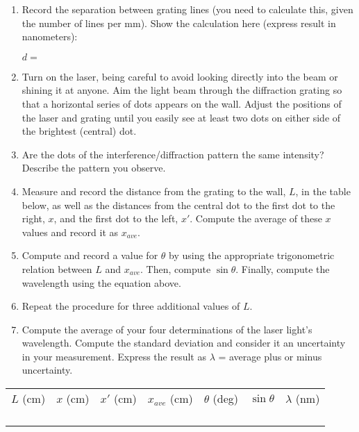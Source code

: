 \begin{enumerate}[labparts]
\item Record the separation between grating lines (you need to calculate this, given the number of lines per mm). Show the calculation here (express result in nanometers):

\( d= \)
\vspace{10mm}
\item Turn on the laser, being careful to avoid looking directly into the
beam or shining it at anyone. Aim the light beam through the diffraction
grating so that a horizontal series of dots appears on the wall. Adjust
the positions of the laser and grating until you easily see at least
two dots on either side of the brightest (central) dot.
\item Are the dots of the interference/diffraction pattern the same intensity?
Describe the pattern you observe.\vspace{15mm}

\item Measure and record the distance from the grating to the wall, $L$, in 
the table below, as well as the distances from the central dot to the first 
dot to the right, $x$, and the first dot to the left, $x'$. Compute the average
of these $x$ values and record it as $x_{ave}$.
\item Compute and record a value for $\theta$ by using the appropriate 
trigonometric relation between $L$ and $x_{ave}$. Then, compute $\sin \theta$. 
Finally, compute the wavelength using the equation above.
\item Repeat the procedure for three additional values of $L$.
\item Compute the average of your four determinations of the laser light's
wavelength. Compute the standard deviation and consider it an uncertainty in 
your measurement. Express the result as $\lambda$ = average plus or minus 
uncertainty.

\end{enumerate}
\vspace{15mm}
\begin{center}
{\renewcommand{\arraystretch}{1.5}
\begin{tabular}{|c|c|c|c|c|c|c|}
\hline 
\( L \) (cm)&
\( x \) (cm)&
\( x' \) (cm)&
\( x_{ave} \) (cm)&
\( \theta  \) (deg)&
\( \sin \theta  \)&
\( \lambda  \) (nm)\\
\hhline{|=|=|=|=|=|=|=|}
& & & & & & \\
\hline 
& & & & & & \\
\hline 
& & & & & & \\
\hline 
& & & & & & \\
\hline 
\end{tabular}
}
\vspace{0.3cm}

\end{center}
